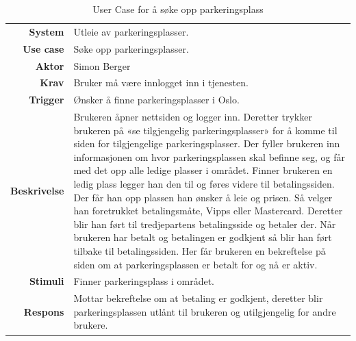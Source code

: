 \begin{table}[H]
\begin{tabularx}{\textwidth}{r|X}
\textbf{System}      & Utleie av parkeringsplasser. \\ [.5em]
\textbf{Use case}    & Søke opp parkeringsplasser.  \\ [.5em]
\textbf{Aktor}       & Simon Berger  \\ [.5em]
\textbf{Krav}        & Bruker må være innlogget inn i tjenesten. \\ [.5em]
\textbf{Trigger}     & Ønsker å finne parkeringsplasser i Oslo.\\ [.5em]
\textbf{Beskrivelse} & Brukeren åpner nettsiden og logger inn. Deretter trykker brukeren på «se tilgjengelig parkeringsplasser» for å  komme til siden for tilgjengelige parkeringsplasser. Der fyller brukeren inn informasjonen om hvor  parkeringsplassen skal befinne seg, og får med det opp alle ledige plasser i området. Finner brukeren en ledig plass legger han den til og føres videre  til betalingssiden. Der får han opp plassen han ønsker å leie og prisen. Så velger han foretrukket betalingsmåte, Vipps eller Mastercard. Deretter blir han ført til tredjepartens betalingsside og betaler der. Når brukeren har betalt og betalingen er godkjent så blir han ført tilbake til betalingssiden. Her får brukeren en bekreftelse på siden om at parkeringsplassen er betalt for og nå er aktiv. \vspace{0.5em} \\ 
\textbf{Stimuli}     & Finner parkeringsplass i området. \\ [.5em]
\textbf{Respons}     & Mottar bekreftelse om at betaling er godkjent, deretter blir  parkeringsplassen utlånt til brukeren og utilgjengelig for andre brukere.
\end{tabularx}
    \caption{User Case for å søke opp parkeringsplass}
    \label{tab:simon_søk_parkeringsplass}
\end{table}

